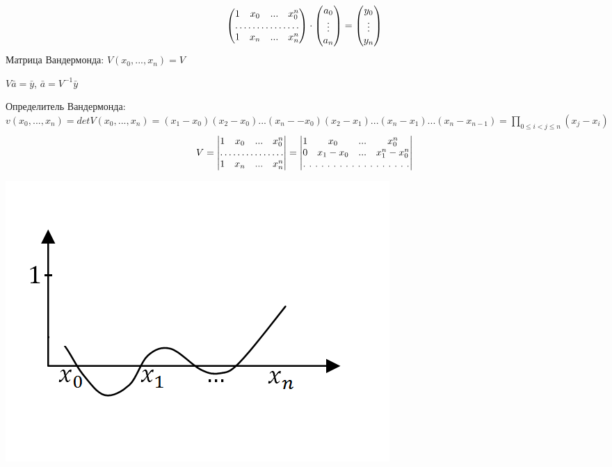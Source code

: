 \documentclass[12pt]{article}
\theoremstyle{definition}
\numberwithin{equation}{section}
\begin{document}
	\[\begin{pmatrix}
	1 & x_0 & ... & x_0^n \\
	\hdotsfor[1]{4} \\
	1 & x_n & ... & x_n^n
	\end{pmatrix} \cdot \begin{pmatrix}
	a_0 \\
	\vdots\\
	a_n
	\end{pmatrix} = \begin{pmatrix}
	y_0 \\
	\vdots\\
	y_n
	\end{pmatrix}\]
	Матрица Вандермонда: $V(x_0,...,x_n)=V$ 
	\begin{center}$V \bar a = \bar y$, $\bar a=V^{-1} \bar y$\end{center}
	Определитель Вандермонда: $v(x_0,...,x_n) = det V(x_0,...,x_n) = (x_1-x_0)(x_2-x_0)...(x_n--x_0)(x_2-x_1)...(x_n-x_1)...(x_n-x_{n-1}) = \prod\limits_{0 \leq i < j \leq n} (x_j-x_i)$ 
	\[ V = \begin{vmatrix}
	1 & x_0 & ... & x_0^n \\
	\hdotsfor[1]{4} \\
	1 & x_n & ... & x_n^n
	\end{vmatrix} = \begin{vmatrix}
	1 & x_0 & ... & x_0^n \\
	0 & x_1-x_0 & ... & x_1^n-x_0^n \\
	\hdotsfor[2]{4} 
	\end{vmatrix}\]
	\begin{center}
		\includegraphics[scale=0.5]{l3_1.png}
	\end{center}
\end{document}
